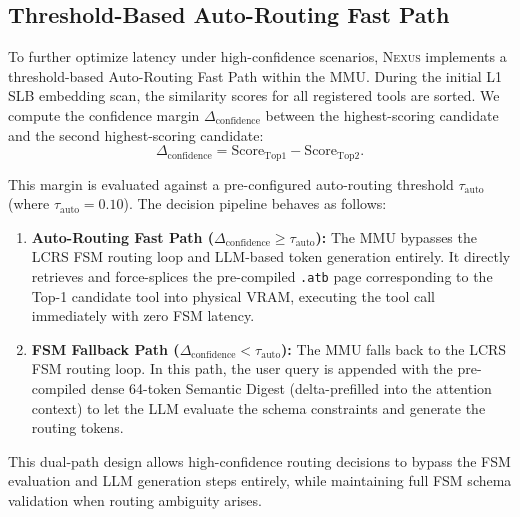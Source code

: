\documentclass[conference,10pt]{IEEEtran}
\newcommand{\Nexus}{\textsc{Nexus}\xspace}
\begin{document}
\subsection{Threshold-Based Auto-Routing Fast Path}
\label{subsec:arch-autorouting}

To further optimize latency under high-confidence scenarios, \Nexus implements a threshold-based Auto-Routing Fast Path within the MMU. During the initial L1 SLB embedding scan, the similarity scores for all registered tools are sorted. We compute the confidence margin $\Delta_{\text{confidence}}$ between the highest-scoring candidate and the second highest-scoring candidate:
\begin{equation}
\Delta_{\text{confidence}} = \text{Score}_{\text{Top1}} - \text{Score}_{\text{Top2}}.
\end{equation}

This margin is evaluated against a pre-configured auto-routing threshold $\tau_{\text{auto}}$ (where $\tau_{\text{auto}} = 0.10$). The decision pipeline behaves as follows:
\begin{enumerate}
  \item \textbf{Auto-Routing Fast Path ($\Delta_{\text{confidence}} \ge \tau_{\text{auto}}$):} The MMU bypasses the LCRS FSM routing loop and LLM-based token generation entirely. It directly retrieves and force-splices the pre-compiled \texttt{.atb} page corresponding to the Top-1 candidate tool into physical VRAM, executing the tool call immediately with zero FSM latency.
  \item \textbf{FSM Fallback Path ($\Delta_{\text{confidence}} < \tau_{\text{auto}}$):} The MMU falls back to the LCRS FSM routing loop. In this path, the user query is appended with the pre-compiled dense 64-token Semantic Digest (delta-prefilled into the attention context) to let the LLM evaluate the schema constraints and generate the routing tokens.
\end{enumerate}
This dual-path design allows high-confidence routing decisions to bypass the FSM evaluation and LLM generation steps entirely, while maintaining full FSM schema validation when routing ambiguity arises.


\end{document}
